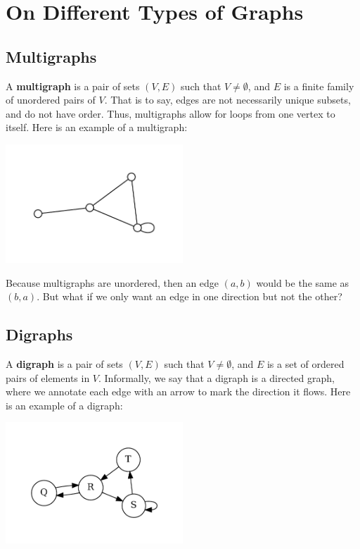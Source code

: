 \section{On Different Types of Graphs}
\subsection{Multigraphs}
A \textbf{multigraph} is a pair of sets $(V, E)$ such that $V \neq \emptyset$, and $E$ is a finite family of unordered pairs of $V$. That is to say, edges are not necessarily unique subsets, and do not have order. Thus, multigraphs allow for loops from one vertex to itself. Here is an example of a multigraph:

\begin{center}
    \includegraphics[width=0.5\textwidth]{Chapter1/multigraph.pdf}
\end{center}

Because multigraphs are unordered, then an edge $(a, b)$ would be the same as $(b, a)$. But what if we only want an edge in one direction but not the other?
\subsection{Digraphs}
A \textbf{digraph} is a pair of sets $(V, E)$ such that $V \neq \emptyset$, and $E$ is a set of ordered pairs of elements in $V$. Informally, we say that a digraph is a directed graph, where we annotate each edge with an arrow to mark the direction it flows. Here is an example of a digraph:

\begin{center}
    \includegraphics[width=0.5\textwidth]{Chapter1/digraph.pdf}
\end{center}


